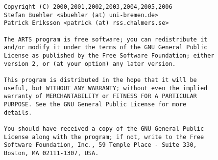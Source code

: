 \newpage                          
\thispagestyle{empty}
\vspace*{\fill}
\noindent
\begin{verbatim}
Copyright (C) 2000,2001,2002,2003,2004,2005,2006
Stefan Buehler <sbuehler (at) uni-bremen.de>
Patrick Eriksson <patrick (at) rss.chalmers.se>

The ARTS program is free software; you can redistribute it
and/or modify it under the terms of the GNU General Public
License as published by the Free Software Foundation; either
version 2, or (at your option) any later version.

This program is distributed in the hope that it will be
useful, but WITHOUT ANY WARRANTY; without even the implied
warranty of MERCHANTABILITY or FITNESS FOR A PARTICULAR
PURPOSE. See the GNU General Public License for more
details. 

You should have received a copy of the GNU General Public
License along with the program; if not, write to the Free
Software Foundation, Inc., 59 Temple Place - Suite 330,
Boston, MA 02111-1307, USA. 
\end{verbatim}



